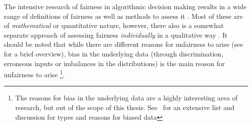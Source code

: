 The intensive research of fairness in algorithmic decision making results in a wide range of definitions of fairness as well as methods to assess it \parencite{CorbettDavies2023}.
Most of these are of \textit{mathematical} or quantitative nature, however, there also is a somewhat separate approach of assessing fairness \textit{individually} in a qualitative way \parencite{Chouldechova2018}.
It should be noted that while there are different reasons for unfairness to arise (see~\cite{Chouldechova2018} for a brief overview), bias in the underlying data (through discrimination, erroneous inputs or imbalances in the distributions) 
is the main reason for unfairness to arise \parencite{Choras2020}\footnote{The reasons for bias in the underlying data are a highly interesting area of research, but out of the scope of this thesis. See~\cite{Mehrabi2021} for an extensive list and discussion for types and reasons for biased data}.
%
